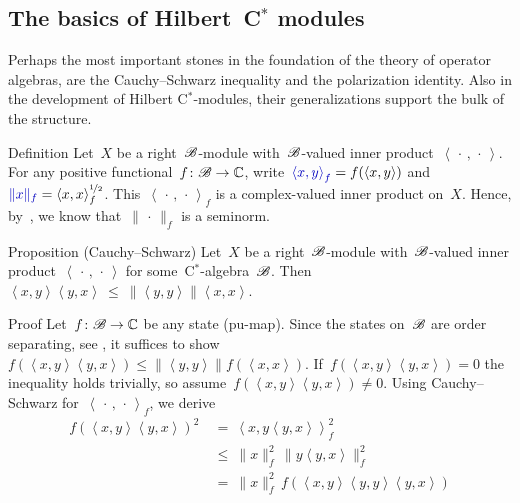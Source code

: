 \subsection{The basics of Hilbert~C$^*$ modules}
\begin{parsec}%
\begin{point}%
    Perhaps the most important stones in the foundation
        of the theory of operator algebras,
        are the Cauchy--Schwarz inequality
        and the polarization identity.
    Also in the development of Hilbert C$^*$-modules,
        their generalizations support the bulk of the structure.
\end{point}
\begin{point}{Definition}%
Let~$X$ be a right~$\mathscr{B}$-module with~$\mathscr{B}$-valued inner
    product~$\left<\,\cdot\,,\,\cdot\,\right>$.
For any positive functional~$f\colon \mathscr{B} \to \mathbb{C}$,
write~$\Define{\left<x,y\right>_f} = f(\left<x,y\right>)$
and~$\Define{\|x\|_f} = \smash{ \langle x,x\rangle^{\nicefrac{1}{2}}_f}$.
This~$\left<\,\cdot\,,\,\cdot\,\right>_f$
    is a complex-valued inner product on~$X$.
Hence, by~,
    we know that~$\|\,\cdot\,\|_f$ is a seminorm.
\end{point}
\begin{point}[module-CS]{Proposition (Cauchy--Schwarz)}%
Let~$X$ be a right~$\mathscr{B}$-module
    with~$\mathscr{B}$-valued inner product~$\left<\,\cdot\,,\,\cdot\,\right>$
    for some~C$^*$-algebra~$\mathscr{B}$.
Then~$\left<x,y\right>\left<y,x\right> \ \leq\  \|\left<y,y\right>\| \left<x,x\right>$.
\begin{point}{Proof}%
Let~$f\colon \mathscr{B} \to \mathbb{C}$ be any state (pu-map).
Since the states on~$\mathscr{B}$ are order separating,
see ,
it suffices to show~$f(\left<x,y\right>\left<y,x\right>)
\leq \|\left<y,y\right>\| f(\left<x,x\right>)$.
If~$f(\left<x,y\right>\left<y,x\right>) = 0$
the inequality holds trivially,
so assume~$f(\left<x,y\right>\left<y,x\right>) \neq 0$.
Using Cauchy--Schwarz for~$\left<\,\cdot\,,\,\cdot\,\right>_f$,
    we derive
\begin{align*}
    f(\left<x,y\right>\left<y,x\right>)^2
        &\  =\  \left<x,y\left<y,x\right>\right>_f^2 \\
        &\  \leq\  \|x\|_f^2 \, \|y \left<y,x\right>\|_f^2 \\
    & \ =\  \|x\|_f^2\, f(\left<x,y\right>\left<y,y\right>\left<y,x\right>)\\

\end{align*}
\end{point}
\end{point}
\end{parsec}
